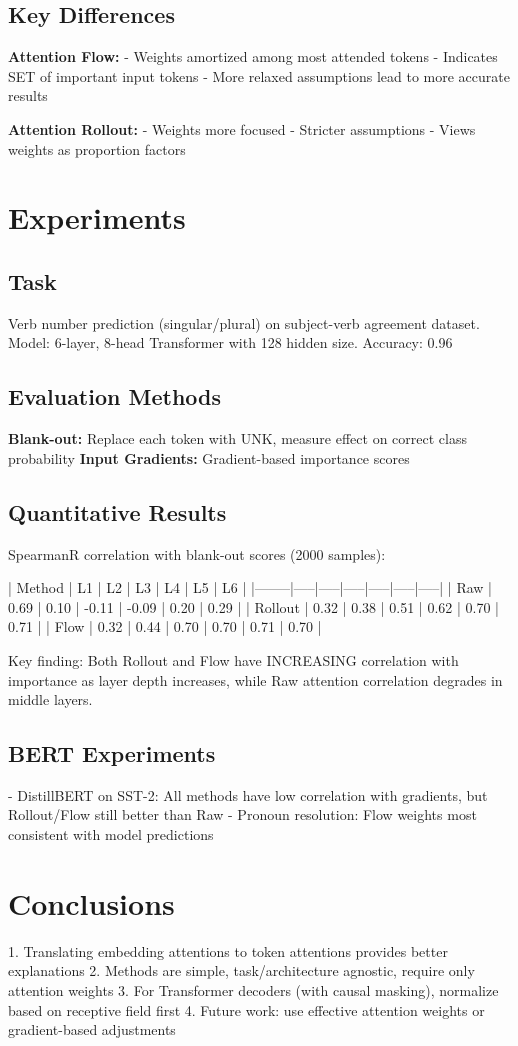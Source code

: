 \subsection{Key Differences}
\textbf{Attention Flow:}
- Weights amortized among most attended tokens
- Indicates SET of important input tokens
- More relaxed assumptions lead to more accurate results

\textbf{Attention Rollout:}
- Weights more focused
- Stricter assumptions
- Views weights as proportion factors

\section{Experiments}

\subsection{Task}
Verb number prediction (singular/plural) on subject-verb agreement dataset. Model: 6-layer, 8-head Transformer with 128 hidden size. Accuracy: 0.96

\subsection{Evaluation Methods}
\textbf{Blank-out:} Replace each token with UNK, measure effect on correct class probability
\textbf{Input Gradients:} Gradient-based importance scores

\subsection{Quantitative Results}
SpearmanR correlation with blank-out scores (2000 samples):

| Method | L1 | L2 | L3 | L4 | L5 | L6 |
|--------|-----|-----|-----|-----|-----|-----|
| Raw | 0.69 | 0.10 | -0.11 | -0.09 | 0.20 | 0.29 |
| Rollout | 0.32 | 0.38 | 0.51 | 0.62 | 0.70 | 0.71 |
| Flow | 0.32 | 0.44 | 0.70 | 0.70 | 0.71 | 0.70 |

Key finding: Both Rollout and Flow have INCREASING correlation with importance as layer depth increases, while Raw attention correlation degrades in middle layers.

\subsection{BERT Experiments}
- DistillBERT on SST-2: All methods have low correlation with gradients, but Rollout/Flow still better than Raw
- Pronoun resolution: Flow weights most consistent with model predictions

\section{Conclusions}
1. Translating embedding attentions to token attentions provides better explanations
2. Methods are simple, task/architecture agnostic, require only attention weights
3. For Transformer decoders (with causal masking), normalize based on receptive field first
4. Future work: use effective attention weights or gradient-based adjustments
